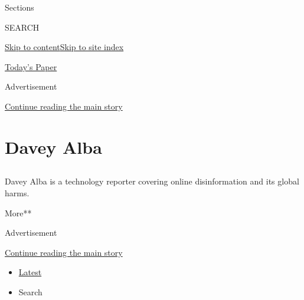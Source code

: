 Sections

SEARCH

\protect\hyperlink{site-content}{Skip to
content}\protect\hyperlink{site-index}{Skip to site index}

\href{https://myaccount.nytimes.com/auth/login?response_type=cookie\&client_id=vi}{}

\href{https://www.nytimes.com/section/todayspaper}{Today's Paper}

Advertisement

\protect\hyperlink{after-top}{Continue reading the main story}

\hypertarget{davey-alba}{%
\section{Davey Alba}\label{davey-alba}}

\subsection{}

Davey Alba is a technology reporter covering online disinformation and
its global harms.

More**

Advertisement

\protect\hyperlink{after-mid1}{Continue reading the main story}

\begin{itemize}
\tightlist
\item
  \protect\hyperlink{stream-panel}{Latest}
\item
  Search
\end{itemize}

